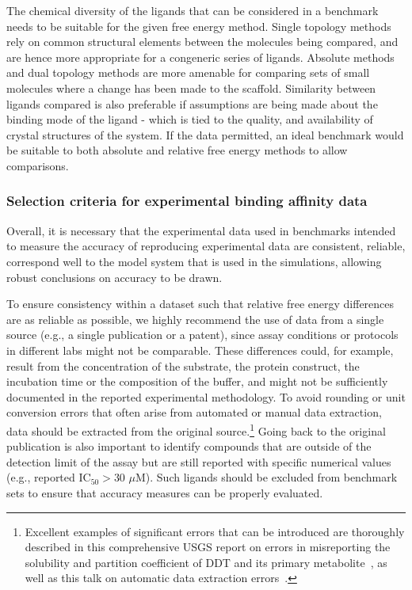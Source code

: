\documentclass[9pt,bestpractices]{livecoms}
\begin{document}
The chemical diversity of the ligands that can be considered in a benchmark needs to be suitable for the given free energy method. Single topology methods rely on common structural elements between the molecules being compared, and are hence more appropriate for a congeneric series of ligands. Absolute methods and dual topology methods are more amenable for comparing sets of small molecules where a change has been made to the scaffold. Similarity between ligands compared is also preferable if assumptions are being made about the binding mode of the ligand - which is tied to the quality, and availability of crystal structures of the system. If the data permitted, an ideal benchmark would be suitable to both absolute and relative free energy methods to allow comparisons.

\subsubsection{Selection criteria for experimental binding affinity data}
Overall, it is necessary that the experimental data used in benchmarks intended to measure the accuracy of reproducing experimental data are consistent, reliable, correspond well to the model system that is used in the simulations, allowing robust conclusions on accuracy to be drawn.

To ensure consistency within a dataset such that relative free energy differences are as reliable as possible, we highly recommend the use of data from a single source (e.g., a single publication or a patent), since assay conditions or protocols in different labs might not be comparable. 
These differences could, for example, result from the concentration of the substrate, the protein construct, the incubation time or the composition of the buffer, and might not be sufficiently documented in the reported experimental methodology. 
To avoid rounding or unit conversion errors that often arise from automated or manual data extraction, data should be extracted from the original source.\footnote{Excellent examples of significant errors that can be introduced are thoroughly described in this comprehensive USGS report on errors in misreporting the solubility and partition coefficient of DDT and its primary metabolite~\cite{pontolillo2001search}, as well as this talk on automatic data extraction errors~\cite{daga_pankaj_r_2019_3445476}.}
Going back to the original publication is also important to identify compounds that are outside of the detection limit of the assay but are still reported with specific numerical values (e.g., reported IC$_{50} > 30 \,\,\mu$M). Such ligands should be excluded from benchmark sets to ensure that accuracy measures can be properly evaluated.
\end{document}
